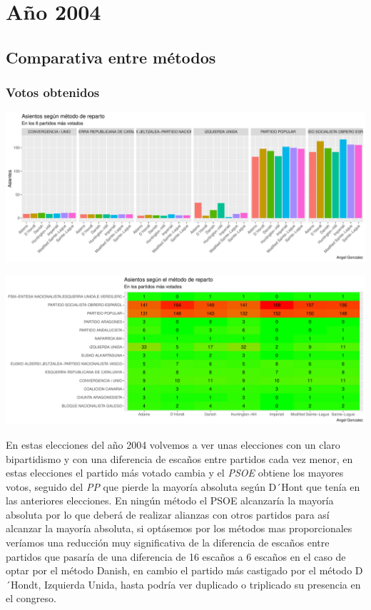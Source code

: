 \documentclass[12pt,a4paper,]{book}
\numberwithin{dummy}{section}
\theoremstyle{ocrenumbox}
\theoremstyle{blacknumex}
\theoremstyle{blacknumbox}
\theoremstyle{ocrenum}
\theoremstyle{ocrenum}
\begin{document}
\hypertarget{auxf1o-2004}{%
\section{Año 2004}\label{auxf1o-2004}}

\hypertarget{comparativa-entre-muxe9todos-8}{%
\subsection{Comparativa entre
métodos}\label{comparativa-entre-muxe9todos-8}}

\hypertarget{votos-obtenidos-8}{%
\subsubsection{Votos obtenidos}\label{votos-obtenidos-8}}

\begin{center}\includegraphics[width=0.95\linewidth]{figurasR/unnamed-chunk-131-1} \end{center}

\begin{center}\includegraphics[width=0.95\linewidth]{figurasR/unnamed-chunk-131-2} \end{center}

En estas elecciones del año 2004 volvemos a ver unas elecciones con un
claro bipartidismo y con una diferencia de escaños entre partidos cada
vez menor, en estas elecciones el partido más votado cambia y el
\emph{PSOE} obtiene los mayores votos, seguido del \emph{PP} que pierde
la mayoría absoluta según D´Hont que tenía en las anteriores elecciones.
En ningún método el PSOE alcanzaría la mayoría absoluta por lo que
deberá de realizar alianzas con otros partidos para así alcanzar la
mayoría absoluta, si optásemos por los métodos mas proporcionales
veríamos una reducción muy significativa de la diferencia de escaños
entre partidos que pasaría de una diferencia de 16 escaños a 6 escaños
en el caso de optar por el método Danish, en cambio el partido más
castigado por el método D´Hondt, Izquierda Unida, hasta podría ver
duplicado o triplicado su presencia en el congreso.
\end{document}
